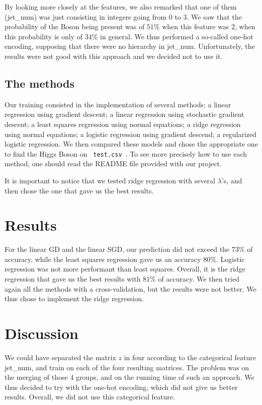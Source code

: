 \documentclass[10pt, oneside]{article}   	%
\begin{document}
By looking more closely at the features, we also remarked that one of them (jet\_num) was just consisting in integers going from $0$ to $3$. We saw that the probability of the Boson being present was of $51\%$ when this feature was $2$, when this probability is only of $34\%$ in general. We thus performed a so-called one-hot encoding, supposing that there were no hierarchy in jet\_num. Unfortunately, the results were not good with this approach and we  decided not to use it.

\subsection{The methods}

Our training consisted in the implementation of several methods:  a linear regression using gradient descent; a linear regression using stochastic gradient descent; a least squares regression using normal equations; a ridge regression using normal equations; a logistic regression using gradient descend; a regularized logistic regression. 
We then compared these models and chose the appropriate one to find the Higgs Boson on \lstinline! test.csv !. To see more precisely how to use each method, one should read the README file provided with our project.

It is important to notice that we tested ridge regression with several $\lambda$'s, and then chose the one that gave us the best results.

\section{Results}
For the linear GD and the linear SGD, our prediction did not exceed the $73\%$ of accuracy, while the least squares regression gave us an accuracy $80\%$. Logistic regression was not more performant than least squares. Overall, it is the ridge regression that gave us the best results with $81\%$ of accuracy.
We then tried again all the methods with a cross-validation, but the results were not better. We thus chose to implement the ridge regression.

\section{Discussion}
We could have separated the matrix $z$ in four according to the categorical feature jet\_num, and train on each of the four resulting matrices. The problem was on the merging of those $4$ groups, and on the running time of such an approach. We thus decided to try with the one-hot encoding, which did not give us better results. Overall, we did not use this categorical feature.
\end{document}
